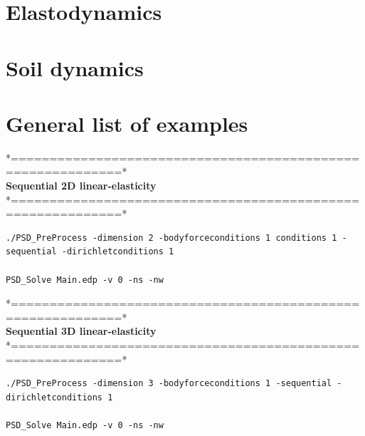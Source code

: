 \pagebreak

\section{Elastodynamics}
\pagebreak

\section{Soil dynamics}



\pagebreak

\section{General list of examples}
 *============================================================*\\
  \textbf{Sequential  2D linear-elasticity}\\                   
 *============================================================*\\
\begin{lstlisting}[style=Linux] 
./PSD_PreProcess -dimension 2 -bodyforceconditions 1 conditions 1 -sequential -dirichletconditions 1 
	
PSD_Solve Main.edp -v 0 -ns -nw 
\end{lstlisting}


*============================================================*\\
 \textbf{Sequential  3D linear-elasticity}                   \\
*============================================================*\\
\begin{lstlisting}[style=Linux] 
./PSD_PreProcess -dimension 3 -bodyforceconditions 1 -sequential -dirichletconditions 1

PSD_Solve Main.edp -v 0 -ns -nw
\end{lstlisting}


